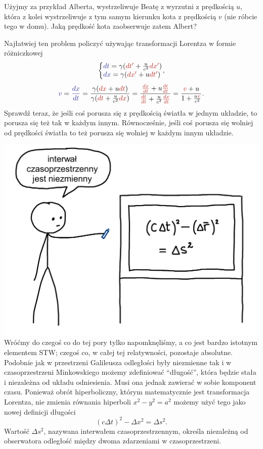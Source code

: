 \documentclass[10pt,twocolumn,fleqn,polish]{article}
\makeatletter
\providecommand{\mathcolor}[2]{{\color{#1}#2}}
\newcommand{\mred}[1]{\mathcolor{BrickRed}{#1}}
\newcommand{\mblue}[1]{\mathcolor{Blue}{#1}}
\newcommand{\diff}{\mathop{}\!{d}}
\newcommand{\derivative}[2][]{\mathop{}\!\frac{{d}#1}{{d}#2}}
\newenvironment{eqsystem}
  {\left\lbrace
    \begin{array}{@{}l@{}}}
  {\end{array}\right.}
\makeatother
\begin{document}
Użyjmy za przykład Alberta, wystrzeliwuje Beatę z wyrzutni z prędkością $u$,
która z kolei wystrzeliwuje z tym samym kierunku kota z prędkością $v$ (nie róbcie tego w domu).
Jaką prędkość kota zaobserwuje zatem Albert?

Najłatwiej ten problem policzyć używając transformacji Lorentza w formie różniczkowej
\[
  \begin{eqsystem}
    \mblue{\diff t} = \gamma (\mred{\diff t'} + \frac{u}{c^2}\mred{\diff x'}) \\
    \mblue{\diff x} = \gamma (\mred{\diff x'} + u \mred{\diff t'})
  \end{eqsystem},
\]
\[
  \mblue{v}
  = \mblue{\derivative[x]{t}}
  = \frac{\gamma (\mred{\diff x} + u \mred{\diff t})}{\gamma (\mred{\diff t} + \frac{u}{c^2} \mred{\diff x})}
  = \frac{\mred{\derivative[x]{t}} + u \mred{\derivative[t]{t}}}{\mred{\derivative[t]{t}} + \frac{u}{c^2}\mred{\derivative[x]{t}}}
  = \frac{\mred v + u}{1 + \frac{u \mred v}{c^2}}.
\]
Sprawdź teraz, że jeśli coś porusza się z prędkością światła w jednym układzie,
to porusza się też tak w każdym innym. Równocześnie, jeśli coś porusza się wolniej od
prędkości światła to też porusza się wolniej w każdym innym układzie.
\newpage

\noindent\includegraphics[width=1\linewidth]{pages/STA-page30}
Wróćmy do czegoś co do tej pory tylko napomknęliśmy, a co jest bardzo
istotnym elementem STW; czegoś co, w całej tej relatywności, pozostaje
absolutne. Podobnie jak w przestrzeni Galileusza odległości były niezmienne
tak i w czasoprzestrzeni Minkowskiego możemy zdefiniować ``długość'', która
będzie stała i niezależna od układu odniesienia. Musi ona jednak zawierać
w sobie komponent czasu. Ponieważ obrót hiperboliczny, którym matematycznie
jest transformacja Lorentza, nie zmienia równania hiperboli $x^2 - y^2 = a^2$
możemy użyć tego jako nowej definicji długości
\[
  (c \Delta t)^2 - \Delta x^2 = \Delta s^2.
\]
Wartość $\Delta s^2$, nazywana interwałem czasoprzestrzennym, określa
niezależną od obserwatora odległość między dwoma zdarzeniami w czasoprzestrzeni.
\end{document}
